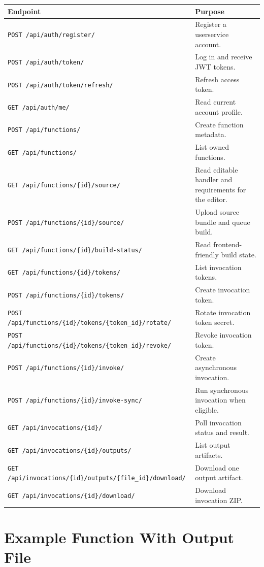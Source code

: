 \documentclass[12pt,a4paper]{report}
\newcommand{\api}[1]{\texttt{#1}}
\begin{document}
\begin{longtable}{p{}p{}}
\toprule
\textbf{Endpoint} & \textbf{Purpose} \\
\midrule
\api{POST /api/auth/register/} & Register a userservice account. \\
\api{POST /api/auth/token/} & Log in and receive JWT tokens. \\
\api{POST /api/auth/token/refresh/} & Refresh access token. \\
\api{GET /api/auth/me/} & Read current account profile. \\
\api{POST /api/functions/} & Create function metadata. \\
\api{GET /api/functions/} & List owned functions. \\
\api{GET /api/functions/\{id\}/source/} & Read editable handler and requirements for the editor. \\
\api{POST /api/functions/\{id\}/source/} & Upload source bundle and queue build. \\
\api{GET /api/functions/\{id\}/build-status/} & Read frontend-friendly build state. \\
\api{GET /api/functions/\{id\}/tokens/} & List invocation tokens. \\
\api{POST /api/functions/\{id\}/tokens/} & Create invocation token. \\
\api{POST /api/functions/\{id\}/tokens/\{token\_id\}/rotate/} & Rotate invocation token secret. \\
\api{POST /api/functions/\{id\}/tokens/\{token\_id\}/revoke/} & Revoke invocation token. \\
\api{POST /api/functions/\{id\}/invoke/} & Create asynchronous invocation. \\
\api{POST /api/functions/\{id\}/invoke-sync/} & Run synchronous invocation when eligible. \\
\api{GET /api/invocations/\{id\}/} & Poll invocation status and result. \\
\api{GET /api/invocations/\{id\}/outputs/} & List output artifacts. \\
\api{GET /api/invocations/\{id\}/outputs/\{file\_id\}/download/} & Download one output artifact. \\
\api{GET /api/invocations/\{id\}/download/} & Download invocation ZIP. \\
\bottomrule
\end{longtable}

\chapter{Example Function With Output File}
\end{document}
